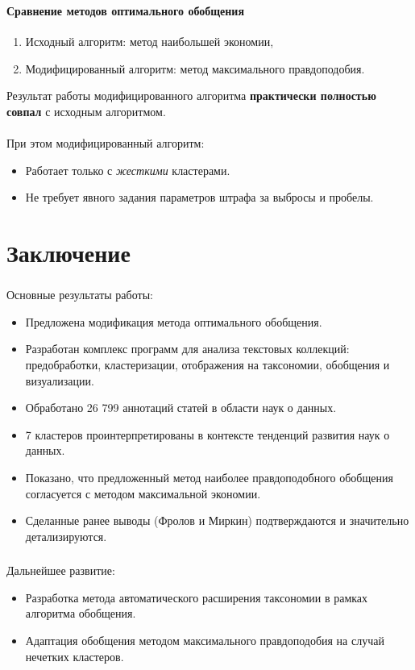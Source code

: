 \documentclass[aspectratio=169]{beamer}
\begin{document}
\begin{frame}
	\frametitle{\insertsection}
	\framesubtitle{Сравнение методов оптимального обобщения}
	
	\begin{enumerate}
		\item Исходный алгоритм: метод наибольшей экономии,
		\item Модифицированный алгоритм: метод максимального правдоподобия.
	\end{enumerate}
	Результат работы модифицированного алгоритма \textbf{практически полностью совпал} с исходным алгоритмом.\\
	~\\
	
	При этом модифицированный алгоритм:
	\begin{itemize}
		\item Работает только с \emph{жесткими} кластерами.
		\item Не требует явного задания параметров штрафа за выбросы и пробелы. 
	\end{itemize}

\end{frame}

\section{Заключение}

\begin{frame}
\frametitle{\insertsection}
Основные результаты работы:
\begin{itemize}
	\item Предложена модификация метода оптимального обобщения.
	\item Разработан комплекс программ для анализа текстовых коллекций: предобработки, кластеризации, отображения на таксономии, обобщения и визуализации.
	\item Обработано 26 799 аннотаций статей в области наук о данных.
	\item 7 кластеров проинтерпретированы в контексте тенденций развития наук о данных.
	\item Показано, что предложенный метод наиболее правдоподобного обобщения согласуется с методом максимальной экономии.
	\item Сделанные ранее выводы (Фролов и Миркин) подтверждаются и значительно детализируются.
\end{itemize}
\end{frame}

\begin{frame}
\frametitle{\insertsection}
Дальнейшее развитие:
\begin{itemize}
\item Разработка метода автоматического расширения таксономии в рамках алгоритма обобщения.
\item Адаптация обобщения методом максимального правдоподобия на случай нечетких кластеров.
\end{itemize}
\end{frame}
\end{document}
